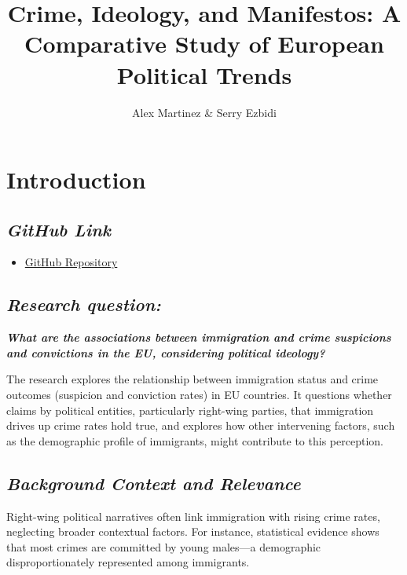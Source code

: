 \documentclass[
]{article}
\title{Crime, Ideology, and Manifestos: A Comparative Study of European
Political Trends}
\author{Alex Martinez \& Serry Ezbidi}
\date{}
\providecommand{\tightlist}{%
  \setlength{\itemsep}{0pt}\setlength{\parskip}{0pt}}\usepackage{longtable,booktabs,array}
\begin{document}
\maketitle


\section{Introduction}\label{introduction}

\subsection{\texorpdfstring{\emph{GitHub
Link}}{GitHub Link}}\label{github-link}

\begin{itemize}
\tightlist
\item
  \href{https://github.com/alexmar313/Data-Management-Project.git}{GitHub
  Repository}
\end{itemize}

\subsection{\texorpdfstring{\emph{Research
question:}}{Research question:}}\label{research-question}

\textbf{\emph{What are the associations between immigration and crime
suspicions and convictions in the EU, considering political ideology?}}

The research explores the relationship between immigration status and
crime outcomes (suspicion and conviction rates) in EU countries. It
questions whether claims by political entities, particularly right-wing
parties, that immigration drives up crime rates hold true, and explores
how other intervening factors, such as the demographic profile of
immigrants, might contribute to this perception.

\subsection{\texorpdfstring{\emph{Background Context and
Relevance}}{Background Context and Relevance}}\label{background-context-and-relevance}

Right-wing political narratives often link immigration with rising crime
rates, neglecting broader contextual factors. For instance, statistical
evidence shows that most crimes are committed by young males---a
demographic disproportionately represented among immigrants.
\end{document}

